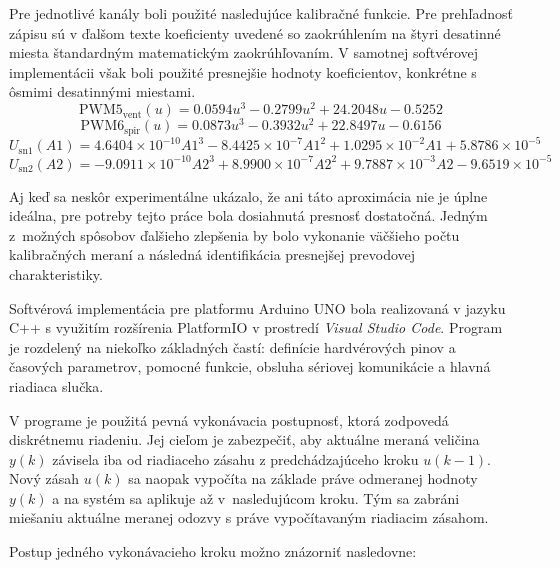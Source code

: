 Pre jednotlivé kanály boli použité nasledujúce kalibračné funkcie. Pre
prehľadnosť zápisu sú v ďalšom texte koeficienty uvedené so zaokrúhlením
na štyri desatinné miesta štandardným matematickým zaokrúhľovaním. V
samotnej softvérovej implementácii však boli použité presnejšie hodnoty
koeficientov, konkrétne s ôsmimi desatinnými miestami.
\begin{equation}
    \mathrm{PWM5}_{\mathrm{vent}}(u) =
    0.0594u^3 - 0.2799u^2 + 24.2048u - 0.5252
    \label{eq:cal_pwm5}
\end{equation}
\begin{equation}
    \mathrm{PWM6}_{\mathrm{spir}}(u) =
    0.0873u^3 - 0.3932u^2 + 22.8497u - 0.6156
    \label{eq:cal_pwm6}
\end{equation}
\begin{equation}
    U_{\mathrm{sn1}}(A1) =
    4.6404 \times 10^{-10} A1^3
    - 8.4425 \times 10^{-7} A1^2
    + 1.0295 \times 10^{-2} A1
    + 5.8786 \times 10^{-5}
    \label{eq:cal_a1}
\end{equation}
\begin{equation}
    U_{\mathrm{sn2}}(A2) =
    -9.0911 \times 10^{-10} A2^3
    + 8.9900 \times 10^{-7} A2^2
    + 9.7887 \times 10^{-3} A2
    - 9.6519 \times 10^{-5}
    \label{eq:cal_a2}
\end{equation}

Aj keď sa neskôr experimentálne ukázalo, že ani táto aproximácia nie je úplne ideálna,
pre potreby tejto práce bola dosiahnutá presnosť dostatočná.
Jedným z~možných spôsobov ďalšieho zlepšenia by bolo vykonanie väčšieho počtu
kalibračných meraní a následná identifikácia presnejšej prevodovej charakteristiky.

Softvérová implementácia pre platformu Arduino UNO bola realizovaná
v jazyku C++ s využitím rozšírenia PlatformIO v prostredí
\textit{Visual Studio Code}. Program je rozdelený na niekoľko základných častí:
definície hardvérových pinov a časových parametrov, pomocné funkcie,
obsluha sériovej komunikácie a hlavná riadiaca slučka.

V programe je použitá pevná vykonávacia postupnosť, ktorá zodpovedá diskrétnemu
riadeniu. Jej cieľom je zabezpečiť, aby aktuálne meraná veličina $y(k)$ závisela
iba od riadiaceho zásahu z predchádzajúceho kroku $u(k-1)$. Nový zásah $u(k)$ sa
naopak vypočíta na základe práve odmeranej hodnoty $y(k)$ a na systém sa aplikuje
až v~nasledujúcom kroku. Tým sa zabráni miešaniu aktuálne meranej odozvy
s práve vypočítavaným riadiacim zásahom.

Postup jedného vykonávacieho kroku možno znázorniť nasledovne:


